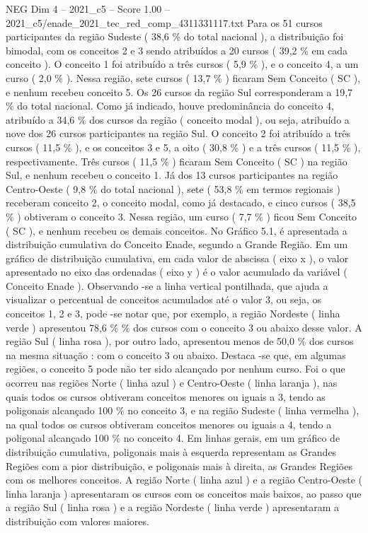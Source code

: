 \begin{textsample}{NEG Dim 4 – 2021\_c5 – Score 1.00 – 2021\_c5/enade\_2021\_tec\_red\_comp\_4311331117.txt}
Para os 51 cursos participantes da região Sudeste ( 38,6 \% do total nacional ), a distribuição foi bimodal, com os conceitos 2 e 3 sendo atribuídos a 20 cursos ( 39,2 \% em cada conceito ).
O conceito 1 foi atribuído a três cursos ( 5,9 \% ), e o conceito 4, a um curso ( 2,0 \% ).
Nessa região, sete cursos ( 13,7 \% ) ficaram Sem Conceito ( SC ), e nenhum recebeu conceito 5.
Os 26 cursos da região Sul corresponderam a 19,7 \% do total nacional.
Como já indicado, houve predominância do conceito 4, atribuído a 34,6 \% dos cursos da região ( conceito modal ), ou seja, atribuído a nove dos 26 cursos participantes na região Sul.
O conceito 2 foi atribuído a três cursos ( 11,5 \% ), e os conceitos 3 e 5, a oito ( 30,8 \% ) e a três cursos ( 11,5 \% ), respectivamente.
Três cursos ( 11,5 \% ) ficaram Sem Conceito ( SC ) na região Sul, e nenhum recebeu o conceito 1.
Já dos 13 cursos participantes na região Centro-Oeste ( 9,8 \% do total nacional ), sete ( 53,8 \% em termos regionais ) receberam conceito 2, o conceito modal, como já destacado, e cinco cursos ( 38,5 \% ) obtiveram o conceito 3.
Nessa região, um curso ( 7,7 \% ) ficou Sem Conceito ( SC ), e nenhum recebeu os demais conceitos.
No Gráfico 5.1, é apresentada a distribuição cumulativa do Conceito Enade, segundo a Grande Região.
Em um gráfico de distribuição cumulativa, em cada valor de abscissa ( eixo x ), o valor apresentado no eixo das ordenadas ( eixo y ) é o valor acumulado da variável ( Conceito Enade ).
Observando -se a linha vertical pontilhada, que ajuda a visualizar o percentual de conceitos acumulados até o valor 3, ou seja, os conceitos 1, 2 e 3, pode -se notar que, por exemplo, a região Nordeste ( linha verde ) apresentou 78,6 \% \% dos cursos com o conceito 3 ou abaixo desse valor.
A região Sul ( linha rosa ), por outro lado, apresentou menos de 50,0 \% dos cursos na mesma situação : com o conceito 3 ou abaixo.
Destaca -se que, em algumas regiões, o conceito 5 pode não ter sido alcançado por nenhum curso.
Foi o que ocorreu nas regiões Norte ( linha azul ) e Centro-Oeste ( linha laranja ), nas quais todos os cursos obtiveram conceitos menores ou iguais a 3, tendo as poligonais alcançado 100 \% no conceito 3, e na região Sudeste ( linha vermelha ), na qual todos os cursos obtiveram conceitos menores ou iguais a 4, tendo a poligonal alcançado 100 \% no conceito 4.
Em linhas gerais, em um gráfico de distribuição cumulativa, poligonais mais à esquerda representam as Grandes Regiões com a pior distribuição, e poligonais mais à direita, as Grandes Regiões com os melhores conceitos.
A região Norte ( linha azul ) e a região Centro-Oeste ( linha laranja ) apresentaram os cursos com os conceitos mais baixos, ao passo que a região Sul ( linha rosa ) e a região Nordeste ( linha verde ) apresentaram a distribuição com valores maiores.

\end{textsample}
